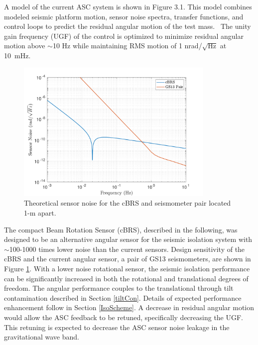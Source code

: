 \documentclass [12pt, proquest]{uwthesis}[2019]
\begin{document}
A model of the current ASC system is shown in Figure 3.1. This model combines modeled seismic platform motion, sensor noise spectra, transfer functions, and control loops to predict the residual angular motion of the test mass.~\cite{ascModel} The unity gain frequency (UGF) of the control is optimized to minimize residual angular motion above $\sim$10 Hz while maintaining RMS motion of 1 nrad/$\sqrt{\text{Hz}}$ at 10~mHz.

\begin{figure}[!h]
\begin{center}
\includegraphics[width=0.85\textwidth]{sensorNoise.pdf}
\caption[Theoretical sensor noise for the cBRS and seismometer pair]{Theoretical sensor noise for the cBRS and seismometer pair located 1-m apart.}
\label{sensNoise}
\end{center}
\end{figure}

The compact Beam Rotation Sensor (cBRS), described in the following, was designed to be an alternative angular sensor for the seismic isolation system with $\sim$100-1000 times lower noise than the current sensors. Design sensitivity of the cBRS and the current angular sensor, a pair of GS13 seismometers, are shown in Figure \ref{sensNoise}. With a lower noise rotational sensor, the seismic isolation performance can be significantly increased in both the rotational and translational degrees of freedom. The angular performance couples to the translational through tilt contamination described in Section \ref{tiltCon}. Details of expected performance enhancement follow in Section \ref{IsoScheme}. A decrease in residual angular motion would allow the ASC feedback to be retuned, specifically decreasing the UGF. This retuning is expected to decrease the ASC sensor noise leakage in the gravitational wave band.
\end{document}
